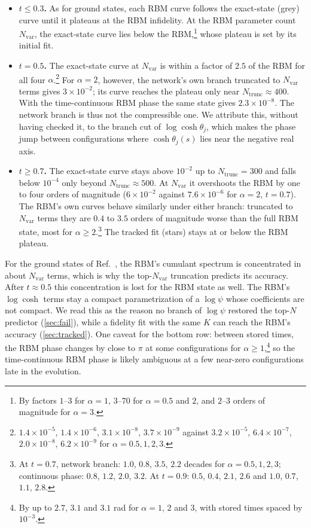 \documentclass[11pt,a4paper]{article}
\begin{document}
\begin{itemize}
  \item \textbf{$t\le0.3$.} As for ground states, each RBM curve follows the exact-state (grey) curve until it plateaus at the RBM infidelity. At the RBM parameter count $N_\mathrm{var}$, the exact-state curve lies below the RBM,\footnote{By factors $1$--$3$ for $\alpha=1$, $3$--$70$ for $\alpha=0.5$ and $2$, and $2$--$3$ orders of magnitude for $\alpha=3$.} whose plateau is set by its initial fit.
  \item \textbf{$t=0.5$.} The exact-state curve at $N_\mathrm{var}$ is within a factor of $2.5$ of the RBM for all four $\alpha$.\footnote{$1.4\times10^{-5}$, $1.4\times10^{-6}$, $3.1\times10^{-8}$, $3.7\times10^{-9}$ against $3.2\times10^{-5}$, $6.4\times10^{-7}$, $2.0\times10^{-8}$, $6.2\times10^{-9}$ for $\alpha=0.5,1,2,3$.} For $\alpha=2$, however, the network's own branch truncated to $N_\mathrm{var}$ terms gives $3\times10^{-2}$; its curve reaches the plateau only near $N_\mathrm{trunc}\approx400$. With the time-continuous RBM phase the same state gives $2.3\times10^{-8}$. The network branch is thus not the compressible one. We attribute this, without having checked it, to the branch cut of $\log\cosh\theta_j$, which makes the phase jump between configurations where $\cosh\theta_j(s)$ lies near the negative real axis.
  \item \textbf{$t\ge0.7$.} The exact-state curve stays above $10^{-2}$ up to $N_\mathrm{trunc}=300$ and falls below $10^{-4}$ only beyond $N_\mathrm{trunc}\approx500$. At $N_\mathrm{var}$ it overshoots the RBM by one to four orders of magnitude ($6\times10^{-2}$ against $7.6\times10^{-6}$ for $\alpha=2$, $t=0.7$). The RBM's own curves behave similarly under either branch: truncated to $N_\mathrm{var}$ terms they are $0.4$ to $3.5$ orders of magnitude worse than the full RBM state, most for $\alpha\ge2$.\footnote{At $t=0.7$, network branch: $1.0$, $0.8$, $3.5$, $2.2$ decades for $\alpha=0.5,1,2,3$; continuous phase: $0.8$, $1.2$, $2.0$, $3.2$. At $t=0.9$: $0.5$, $0.4$, $2.1$, $2.6$ and $1.0$, $0.7$, $1.1$, $2.8$.} The tracked fit (stars) stays at or below the RBM plateau.
\end{itemize}
For the ground states of Ref.~\cite{Cortes25}, the RBM's cumulant spectrum is concentrated in about $N_\mathrm{var}$ terms, which is why the top-$N_\mathrm{var}$ truncation predicts its accuracy. After $t\approx0.5$ this concentration is lost for the RBM state as well. The RBM's $\log\cosh$ terms stay a compact parametrization of a $\log\psi$ whose coefficients are not compact. We read this as the reason no branch of $\log\psi$ restored the top-$N$ predictor (\cref{sec:fail}), while a fidelity fit with the same $K$ can reach the RBM's accuracy (\cref{sec:tracked}). One caveat for the bottom row: between stored times, the RBM phase changes by close to $\pi$ at some configurations for $\alpha\ge1$,\footnote{By up to $2.7$, $3.1$ and $3.1$ rad for $\alpha=1$, $2$ and $3$, with stored times spaced by $10^{-3}$.} so the time-continuous RBM phase is likely ambiguous at a few near-zero configurations late in the evolution.
\end{document}
